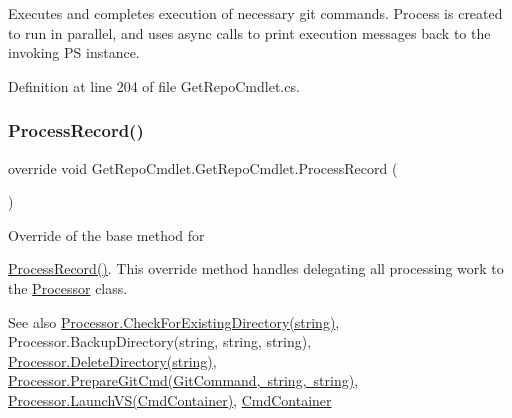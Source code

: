 Executes and completes execution of necessary git commands. Process is created to run in parallel, and uses async calls to print execution messages back to the invoking PS instance. 



Definition at line 204 of file Get\+Repo\+Cmdlet.\+cs.

\mbox{\label{class_get_repo_cmdlet_1_1_get_repo_cmdlet_ada76037eb2a8eed81eb1bb7a21d84693}} 
\subsubsection{\texorpdfstring{Process\+Record()}{ProcessRecord()}}
{\footnotesize\ttfamily override void Get\+Repo\+Cmdlet.\+Get\+Repo\+Cmdlet.\+Process\+Record (\begin{DoxyParamCaption}{ }\end{DoxyParamCaption})\hspace{0.3cm}{\ttfamily [protected]}}



Override of the base method for 

{\ttfamily \mbox{\hyperlink{class_get_repo_cmdlet_1_1_get_repo_cmdlet_ada76037eb2a8eed81eb1bb7a21d84693}{Process\+Record()}}}. This override method handles delegating all processing work to the \mbox{\hyperlink{class_get_repo_cmdlet_1_1_processor}{Processor}} class. 

\begin{DoxySeeAlso}{See also}
\mbox{\hyperlink{class_get_repo_cmdlet_1_1_processor_ace9c1d574b3758f94c8cf65e7fcddbf3}{Processor.\+Check\+For\+Existing\+Directory(string)}}, Processor.\+Backup\+Directory(string, string, string), \mbox{\hyperlink{class_get_repo_cmdlet_1_1_processor_ae5f7bb67f8595174379a2cb144ae22c3}{Processor.\+Delete\+Directory(string)}}, \mbox{\hyperlink{class_get_repo_cmdlet_1_1_processor_a9c532782d2575d5244440407103b4352}{Processor.\+Prepare\+Git\+Cmd(\+Git\+Command, string, string)}}, \mbox{\hyperlink{class_get_repo_cmdlet_1_1_processor_a0d3e38fbd41a8e6bdfbc62dcf4656e90}{Processor.\+Launch\+V\+S(\+Cmd\+Container)}}, \mbox{\hyperlink{class_get_repo_cmdlet_1_1_cmd_container}{Cmd\+Container}}


\end{DoxySeeAlso}


